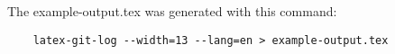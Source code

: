 \documentclass[12pt,a4paper,english,landscape]{scrartcl}
\begin{document}


The example-output.tex was generated with this command:
\begin{verbatim}
	latex-git-log --width=13 --lang=en > example-output.tex
\end{verbatim}
\end{document}
